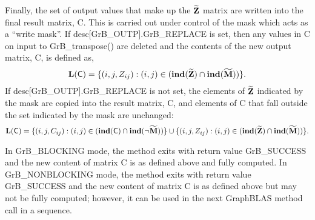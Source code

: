 Finally, the set of output values that make up the ${\bf \widetilde{Z}}$ 
matrix are written into the final result matrix, {\sf C}. 
This is carried out under control of the mask which acts as a ``write mask''.
If {\sf desc[GrB\_OUTP].GrB\_REPLACE} is set, then any values in {\sf C} on 
input to {\sf GrB\_transpose()} are deleted and the contents of the new output matrix,
{\sf C}, is defined as,
\[ 
\bold{L}({\sf C}) = \{(i,j,Z_{ij}) : (i,j) \in (\bold{ind}({\bf \widetilde{Z}}) 
\cap \bold{ind}({\bf \widetilde{M}})) \}. 
\]
If {\sf desc[GrB\_OUTP].GrB\_REPLACE} is not set, the elements of 
${\bf \widetilde{Z}}$ indicated by the mask are copied into the result 
matrix, {\sf C}, and elements of {\sf C} that fall outside the set 
indicated by the mask are unchanged:
\[ 
\bold{L}({\sf C}) = \{(i,j,C_{ij}) : (i,j) \in (\bold{ind}({\bf \sf C}) \cap \bold{ind}(\neg {\bf \widetilde{M}})) \} \cup \{(i,j,Z_{ij}) : (i,j) \in (\bold{ind}({\bf \widetilde{Z}}) \cap \bold{ind}({\bf \widetilde{M}})) \}. 
\]

In {\sf GrB\_BLOCKING} mode, the method exits with return value {\sf GrB\_SUCCESS} and the new content of matrix {\sf C} is as defined above and fully computed.
In {\sf GrB\_NONBLOCKING} mode, the method exits with return value {\sf GrB\_SUCCESS} and the new content of matrix {\sf C} is as defined above but may not be fully computed; however, it can be used in the next GraphBLAS 
method call in a sequence.

